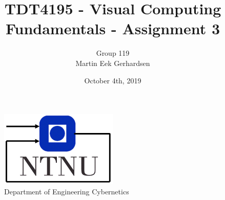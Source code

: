 \documentclass[11pt, a4paper, USenglish]{article} %
\begin{document}
\title{TDT4195 - Visual Computing Fundamentals - Assignment 3}
\author{Group 119\\Martin Eek Gerhardsen}
\date{October 4th, 2019}
\begin{titlepage}
    \maketitle
    \begin{figure}
    \centering
    \includegraphics[width=0.5\textwidth]{figures/itk_ntnu}\\
    Department of Engineering Cybernetics
    \end{figure}
    \thispagestyle{empty}
\end{titlepage}

\newpage
\tableofcontents
\thispagestyle{empty} 

\newpage
\setcounter{page}{1}









\newpage
{}
\printbibliography{}
\label{sec:bibliography}
\end{document}
